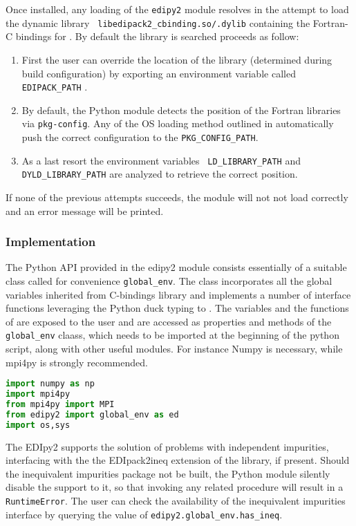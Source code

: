 \documentclass[edipack2.tex]{subfiles}
\begin{document}
Once installed, any loading of the {\tt edipy2} module resolves in the
attempt to load the dynamic library {\tt
  libedipack2\_cbinding.so/.dylib} containing the Fortran-C bindings
for \NAME. By default the library is searched proceeds as follow: 
\begin{enumerate}
\item First the user can override the location of the library
  (determined during \NAME build configuration) by exporting an
  environment variable called {\tt EDIPACK\_PATH} .
\item By default, the Python module detects the position of the
  Fortran libraries via {\tt pkg-config}. Any of the OS loading method
  outlined in  automatically push the
  correct configuration to the {\tt PKG\_CONFIG\_PATH}. 
\item As a last resort the environment variables {\tt
    LD\_LIBRARY\_PATH} and {\tt DYLD\_LIBRARY\_PATH} are analyzed to
  retrieve the correct position. 
\end{enumerate}
If none of the previous attempts succeeds, the module will not not load correctly and an error message will be printed. 



\subsubsection{Implementation}\label{sSecInteropEDIpyImplementation}
The Python API provided in the edipy2 module consists essentially of a
suitable class called for convenience {\tt global\_env}.
The class incorporates all the global variables inherited from \NAME
C-bindings library and implements a number of interface functions
leveraging the Python duck typing to \NAME.  
The variables and the functions of \NAME are exposed to the user and
are accessed as properties and
methods of the {\tt global\_env} claass, which needs to be imported at the beginning
of the python script, along with other useful modules. For instance Numpy is
necessary, while mpi4py is strongly recommended.

\begin{lstlisting}[language=python,  frame=lines]
import numpy as np
import mpi4py
from mpi4py import MPI
from edipy2 import global_env as ed
import os,sys
\end{lstlisting}

The EDIpy2 supports the solution of problems with independent
impurities, interfacing with the the EDIpack2ineq extension of the
library, if present. Should the inequivalent impurities package not be
built, the Python module silently disable the support to it, so that
invoking any related procedure  will result in a {\tt RuntimeError}.
The user can check the availability of the inequivalent impurities
interface by querying the value of  {\tt edipy2.global\_env.has\_ineq}.
\end{document}
